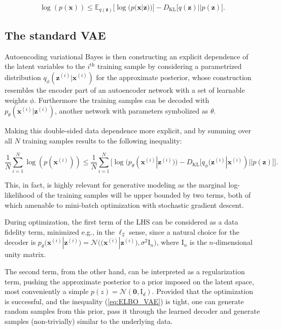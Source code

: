 \documentclass{article}
\begin{document}
\begin{equation}  \label{eq:VB_ELBO}
\log(p(\mathbf{x})) \leqslant \mathbb{E}_{q(\mathbf{z})} \Big[ \log(p(\mathbf{x}|\mathbf{z}))  \Big] - D_{\text{KL}}\Big[ q(\mathbf{z}) || p(\mathbf{z}) \Big].
\end{equation}

\subsection{The standard VAE} \label{subsec:Vanilla_VAE}

Autoencoding variational Bayes \cite{VAE} is then constructing an explicit dependence of the latent variables to the $i^{\text{th}}$ training sample by considering a parametrized distribution $q_{\phi}(\mathbf{z}^{(i)}|\mathbf{x}^{(i)})$ for the approximate posterior, whose construction resembles the encoder part of an autoencoder network with a set of learnable weights $\phi$. Furthermore the training samples can be decoded with $p_{\theta}(\mathbf{x}^{(i)} | \mathbf{z}^{(i)})$, another network with parameters symbolized as $\theta$.

Making this double-sided data dependence more explicit, and by summing over all $N$ training samples results to the following inequality:


\begin{equation} \label{eq:vae_ELBO}
\frac{1}{N}\sum_{i=1}^N \log(p(\mathbf{x}^{(i)})) \leqslant \frac{1}{N} \sum_{i=1}^N \Big[ \log(p_{\theta}(\mathbf{x}^{(i)}|\mathbf{z}^{(i)}))   -  D_{\text{KL}}\big[ q_{\phi}(\mathbf{z}^{(i)}  | \mathbf{x}^{(i)}) || p(\mathbf{z}) \big] \Big].
\end{equation}

This, in fact, is highly relevant for generative modeling as the marginal log-likelihood of the training samples will be upper bounded by two terms, both of which amenable to mini-batch optimization with stochastic gradient descent. 

During optimization, the first term of the LHS can be considered as a data fidelity term, minimized e.g., in the $\ell_2$ sense, since a natural choice for the decoder is $p_{\theta}(\mathbf{x}^{(i)}|\mathbf{z}^{(i)}) = \mathcal{N} \Big( \big( \mathbf{x}^{(i)}|\mathbf{z}^{(i)} \big) , \sigma^2 \mathrm{I}_n \Big)$, where $\mathrm{I}_n$ is the $n$-dimensional unity matrix.

The second term, from the other hand, can be interpreted as a regularization term, pushing the approximate posterior to a prior imposed on the latent space, most conveniently a simple $p(z) = \mathcal{N}(\mathbf{0}, \mathrm{I}_d)$. Provided that the optimization is successful, and the inequality (\ref{eq:ELBO_VAE}) is tight, one can generate random samples from this prior, pass it through the learned decoder and generate samples (non-trivially) similar to the underlying data.   
\end{document}
